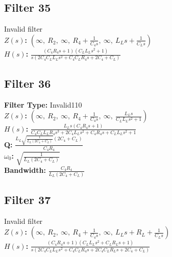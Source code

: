\documentclass{article}
\begin{document}
\subsection*{Filter 35}
Invalid filter \\ 
\textbf{$Z(s)$:} $\left( \infty, \  R_{2}, \  \infty, \  R_{4} + \frac{1}{C_{4} s}, \  \infty, \  L_{L} s + \frac{1}{C_{L} s}\right)$ \\ 
\textbf{$H(s)$:} $\frac{\left(C_{4} R_{4} s + 1\right) \left(C_{L} L_{L} s^{2} + 1\right)}{s \left(2 C_{4} C_{L} L_{L} s^{2} + C_{4} C_{L} R_{4} s + 2 C_{4} + C_{L}\right)}$ \\ 
\subsection*{Filter 36}
\textbf{Filter Type:} Invalid110 \\ 
\textbf{$Z(s)$:} $\left( \infty, \  R_{2}, \  \infty, \  R_{4} + \frac{1}{C_{4} s}, \  \infty, \  \frac{L_{L} s}{C_{L} L_{L} s^{2} + 1}\right)$ \\ 
\textbf{$H(s)$:} $\frac{L_{L} s \left(C_{4} R_{4} s + 1\right)}{C_{4} C_{L} L_{L} R_{4} s^{3} + 2 C_{4} L_{L} s^{2} + C_{4} R_{4} s + C_{L} L_{L} s^{2} + 1}$ \\ 
\textbf{Q:} $\frac{L_{L} \sqrt{\frac{1}{L_{L} \left(2 C_{4} + C_{L}\right)}} \left(2 C_{4} + C_{L}\right)}{C_{4} R_{4}}$ \\ 
\textbf{$\omega_0$:} $\sqrt{\frac{1}{L_{L} \left(2 C_{4} + C_{L}\right)}}$ \\ 
\textbf{Bandwidth:} $\frac{C_{4} R_{4}}{L_{L} \left(2 C_{4} + C_{L}\right)}$ \\ 
\subsection*{Filter 37}
Invalid filter \\ 
\textbf{$Z(s)$:} $\left( \infty, \  R_{2}, \  \infty, \  R_{4} + \frac{1}{C_{4} s}, \  \infty, \  L_{L} s + R_{L} + \frac{1}{C_{L} s}\right)$ \\ 
\textbf{$H(s)$:} $\frac{\left(C_{4} R_{4} s + 1\right) \left(C_{L} L_{L} s^{2} + C_{L} R_{L} s + 1\right)}{s \left(2 C_{4} C_{L} L_{L} s^{2} + C_{4} C_{L} R_{4} s + 2 C_{4} C_{L} R_{L} s + 2 C_{4} + C_{L}\right)}$ \\ 
\end{document}
